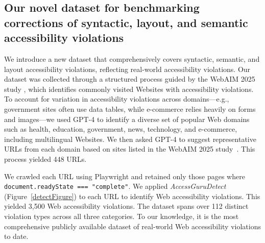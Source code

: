 \documentclass[sigconf, nonacm]{acmart}
\newcommand{\method}{\emph{AccessGuru}}
\begin{document}
\subsection{Our novel dataset for benchmarking corrections of syntactic, layout, and semantic accessibility violations}

We introduce a new dataset that comprehensively covers syntactic, semantic, and layout accessibility violations, reflecting real-world accessibility violations. Our dataset was collected through a structured process guided by the WebAIM 2025 study \cite{Webaim2025}, which identifies commonly visited Websites with accessibility violations. To account for variation in accessibility violations across domains—e.g., government sites often use data tables, while e-commerce relies heavily on forms and images—we used GPT-4 \cite{DBLP:journals/corr/abs-2303-08774} to identify a diverse set of popular Web domains such as health, education, government, news, technology, and e-commerce, including multilingual Websites. We then asked GPT-4 to suggest representative URLs from each domain based on sites listed in the WebAIM 2025 study~\cite{Webaim2025}. This process yielded 448 URLs. 

We crawled each URL using Playwright and retained only those pages where \texttt{document.readyState === "complete"}.  We applied \method \emph{Detect} (Figure~\ref{detectFigure}) to each URL to identify Web accessibility violations.  This yielded 3,500 Web accessibility violations. The dataset spans over 112 distinct violation types across all three categories. To our knowledge, it is the most comprehensive publicly available dataset of real-world Web accessibility violations to date.  
\end{document}
